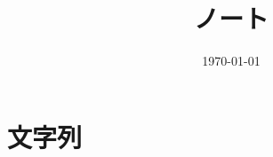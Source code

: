 \documentclass[6pt]{jreport}
\title{ノート}
\author{}
\date{\today}
\begin{document}
\maketitle
\tableofcontents

%
%
\chapter{文字列}

%
%
%
%
%
%
%
%
%



\end{document}
